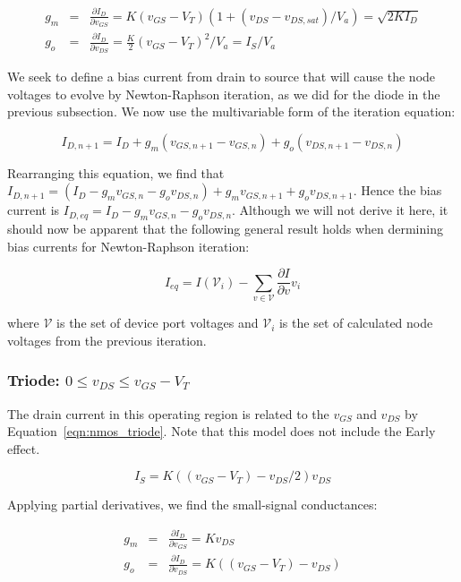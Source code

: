 \documentclass{article}
\begin{document}
\begin{eqnarray}
g_m&=&\frac{\partial I_D}{\partial v_{GS}}=K(v_{GS}-V_T)(1+(v_{DS}-v_{DS,sat})/V_a)=\sqrt{2KI_D} \\
g_o&=&\frac{\partial I_D}{\partial v_{DS}}=\frac{K}{2}(v_{GS}-V_T)^2 / V_a=I_S/V_a
\end{eqnarray}

We seek to define a bias current from drain to source that will cause the node voltages to evolve by Newton-Raphson iteration, as we did for the diode in the previous subsection.  We now use the multivariable form of the iteration equation:

\begin{equation}
I_{D,n+1}=I_D+g_m(v_{GS,n+1}-v_{GS,n})+g_o(v_{DS,n+1}-v_{DS,n})
\end{equation}

Rearranging this equation, we find that $I_{D,n+1}=(I_D-g_mv_{GS,n}-g_ov_{DS,n})+g_mv_{GS,n+1}+g_ov_{DS,n+1}$. Hence the bias current is $I_{D,eq}=I_D-g_mv_{GS,n}-g_ov_{DS,n}$. Although we will not derive it here, it should now be apparent that the following general result holds when dermining bias currents for Newton-Raphson iteration:

\begin{equation}
\label{eqn:bias_current}
I_{eq}=I(\mathcal{V}_i)-\sum_{v \in \mathcal{V}}\frac{\partial I}{\partial v}v_i
\end{equation}

where $\mathcal{V}$ is the set of device port voltages and $\mathcal{V}_i$ is the set of calculated node voltages from the previous iteration.

\subsubsection{Triode: $ 0 \leq v_{DS} \leq v_{GS}-V_T $}

The drain current in this operating region is related to the $v_{GS}$ and $v_{DS}$ by Equation~\ref{eqn:nmos_triode}. Note that this model does not include the Early effect.

\begin{equation}
\label{eqn:nmos_triode}
I_S=K((v_{GS}-V_T)-v_{DS}/2)v_{DS}
\end{equation}

Applying partial derivatives, we find the small-signal conductances:

\begin{eqnarray}
g_m&=&\frac{\partial I_D}{\partial v_{GS}}=Kv_{DS} \\
g_o&=&\frac{\partial I_D}{\partial v_{DS}}=K((v_{GS}-V_T)-v_{DS})
\end{eqnarray}
\end{document}
